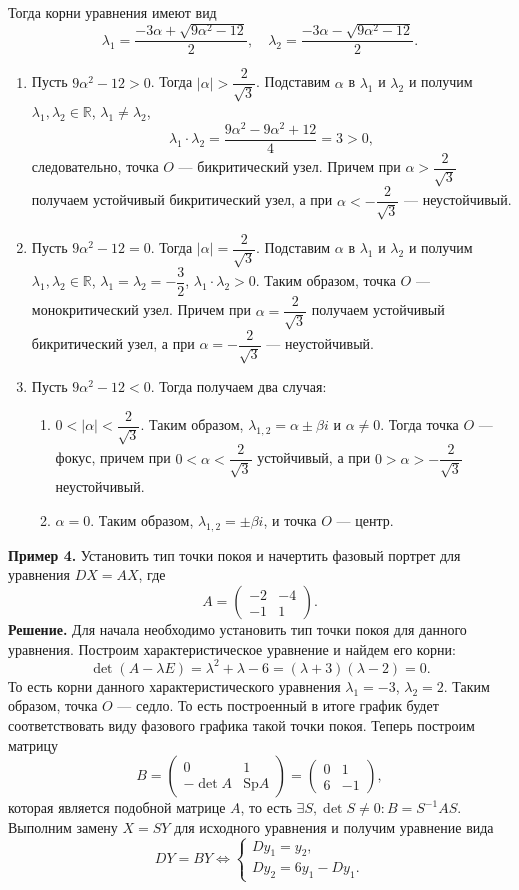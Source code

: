 \documentclass[a4paper, 12pt]{article}
\newcommand{\Rm}{\mathbb{R}}
\newcommand{\Sp}{\text{Sp}}
\begin{document}
Тогда корни уравнения имеют вид $$\lambda_1 = \dfrac{-3\alpha + \sqrt{9\alpha^2 - 12}}{2},\quad \lambda_2 = \dfrac{-3\alpha - \sqrt{9\alpha^2 - 12}}{2}.$$\begin{enumerate}
	\item Пусть $9\alpha^2 - 12 > 0$. Тогда $|\alpha| > \dfrac{2}{\sqrt{3}}$. Подставим $\alpha$ в $\lambda_1$ и $\lambda_2$ и получим $\lambda_1, \lambda_2 \in \Rm$, $\lambda_1 \ne \lambda_2$, $$\lambda_1 \cdot \lambda_2 = \dfrac{9\alpha^2 - 9\alpha^2 + 12}{4} = 3 > 0,$$ следовательно, точка $O$ --- бикритический узел. Причем при $\alpha > \dfrac{2}{\sqrt{3}}$ получаем устойчивый бикритический узел, а при $\alpha < -\dfrac{2}{\sqrt{3}}$ --- неустойчивый.
	\item Пусть $9\alpha^2 - 12 = 0$. Тогда $|\alpha| = \dfrac{2}{\sqrt{3}}$. Подставим $\alpha$ в $\lambda_1$ и $\lambda_2$ и получим $\lambda_1, \lambda_2 \in \Rm$, $\lambda_1 = \lambda_2 = -\dfrac{3}{2}$, $\lambda_1\cdot\lambda_2 > 0$. Таким образом, точка $O$ --- монокритический узел. Причем при $\alpha = \dfrac{2}{\sqrt{3}}$ получаем устойчивый бикритический узел, а при $\alpha = -\dfrac{2}{\sqrt{3}}$ --- неустойчивый.
	\item Пусть $9\alpha^2 - 12 < 0$. Тогда получаем два случая:\begin{enumerate}
		\item $0 < |\alpha| < \dfrac{2}{\sqrt{3}}$. Таким образом, $\lambda_{1,2} = \alpha \pm \beta i$ и $\alpha \ne 0$. Тогда точка $O$ --- фокус, причем при $0 <\alpha < \dfrac{2}{\sqrt{3}}$ устойчивый, а при  $0 > \alpha >- \dfrac{2}{\sqrt{3}}$ неустойчивый.
		\item $\alpha = 0$. Таким образом, $\lambda_{1,2} = \pm \beta i$, и точка $O$ --- центр.
	\end{enumerate}
\end{enumerate}
\textbf{Пример 4.} Установить тип точки покоя и начертить фазовый портрет для уравнения $DX = AX$, где $$A = \begin{pmatrix}
	-2 & -4\\
	-1 & 1
\end{pmatrix}.$$
\textbf{Решение.} Для начала необходимо установить тип точки покоя для данного уравнения. Построим характеристическое уравнение и найдем его корни:
$$\det(A - \lambda E) = \lambda^2 + \lambda - 6 = (\lambda +3)(\lambda -2 ) = 0.$$ То есть корни данного характеристического уравнения $\lambda_1 = -3$, $\lambda_2 = 2$. Таким образом, точка $O$ --- седло. То есть построенный в итоге график будет соответствовать виду фазового графика такой точки покоя. Теперь построим матрицу $$B = \begin{pmatrix}
	0 & 1\\
	-\det A & \Sp A
\end{pmatrix} = \begin{pmatrix}
0 & 1\\
6 & -1
\end{pmatrix},$$ которая является подобной матрице $A$, то есть $\exists S, \det S \ne 0 : B = S^{-1}AS.$ Выполним замену $X = SY$ для исходного уравнения и получим уравнение вида $$DY = BY\Longleftrightarrow\begin{cases}
Dy_1 = y_2,\\
Dy_2 = 6y_1 - Dy_1.
\end{cases}$$
\end{document}

